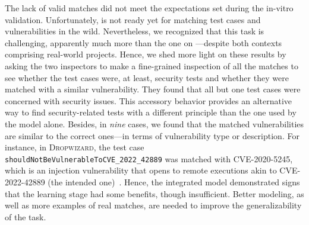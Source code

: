 The lack of valid matches did not meet the expectations set during the in-vitro validation.
Unfortunately, \vuteco is not ready yet for matching test cases and vulnerabilities in the wild.
%
Nevertheless, we recognized that this task is challenging, apparently much more than the one on \VulforJ---despite both contexts comprising real-world \Java projects.
Hence, we shed more light on these results by asking the two inspectors to make a fine-grained inspection of all the matches to see whether the test cases were, at least, security tests and whether they were matched with a similar vulnerability.
They found that all but one test cases were concerned with security issues.
This accessory behavior provides an alternative way to find security-related tests with a different principle than the one used by the \finder model alone. 
Besides, in \emph{nine} cases, we found that the matched vulnerabilities are similar to the correct ones---in terms of vulnerability type or description.
For instance, in \textsc{Dropwizard}, the test case \texttt{shouldNotBeVulnerableToCVE\_2022\_42889} was matched with CVE-2020-5245, which is an injection vulnerability that opens to remote executions akin to CVE-2022-42889 (the intended one)~\cite{dropwizard:example}.
Hence, the integrated model demonstrated signs that the learning stage had some benefits, though insufficient.
Better modeling, as well as more examples of real matches, are needed to improve the generalizability of the \matching task.




